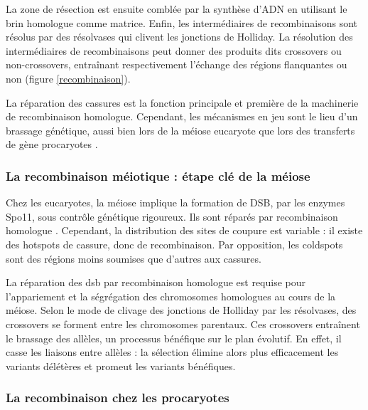 \documentclass[11pt, oneside]{scrartcl}
\begin{document}
La zone de résection est ensuite comblée par la synthèse d'ADN en utilisant le
brin homologue comme matrice. Enfin, les intermédiaires de recombinaisons sont
résolus par des résolvases qui clivent les jonctions de Holliday. La résolution
des intermédiaires de recombinaisons peut donner des produits dits crossovers ou
non-crossovers, entraînant respectivement l'échange des régions flanquantes ou
non \cite{mancera_high-resolution_2008} (figure \ref{recombinaison}). 

\begin{transition}
La réparation des cassures est la fonction principale et première de la
machinerie de recombinaison homologue. Cependant, les mécanismes en jeu sont le
lieu d'un brassage génétique, aussi bien lors de la méiose eucaryote que lors
des transferts de gène procaryotes \cite{redfield_bacteria_2001}.
\end{transition}

\subsubsection{La recombinaison méiotique : étape clé de la méiose}
\label{sec:orgheadline3}

Chez les eucaryotes, la méiose implique la formation de DSB, par les enzymes
Spo11, sous contrôle génétique rigoureux. Ils sont réparés par recombinaison
homologue \cite{chapman_playing_2012}. Cependant, la distribution des sites de
coupure est variable : il existe des hotspots de cassure, donc de recombinaison.
Par opposition, les coldspots sont des régions moins soumises que d'autres aux
cassures.

La réparation des \ac{dsb} par recombinaison homologue est requise pour
l'appariement et la ségrégation des chromosomes homologues au cours de la
méiose. Selon le mode de clivage des jonctions de Holliday par les résolvases,
des crossovers se forment entre les chromosomes parentaux. Ces crossovers
entraînent le brassage des allèles, un processus bénéfique sur le plan
évolutif\cite{webster_direct_2012}. En effet, il casse les liaisons entre
allèles : la sélection élimine alors plus efficacement les variants délétères et
promeut les variants bénéfiques.

\subsubsection{La recombinaison chez les procaryotes}
\label{sec:orgheadline4}
\end{document}
